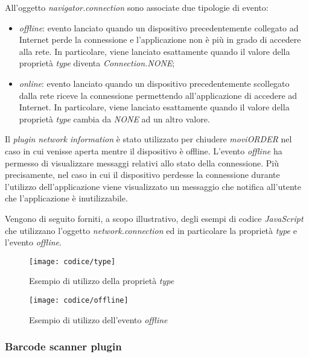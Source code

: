 All'oggetto \textit{navigator.connection} sono associate due tipologie di evento:
\begin{itemize}
	\item \textit{offline}: evento lanciato quando un dispositivo precedentemente collegato ad Internet perde la connessione e l'applicazione non è più in grado di accedere alla rete. In particolare, viene lanciato esattamente quando il valore della proprietà \textit{type} diventa \textit{Connection.NONE};
	\item \textit{online}: evento lanciato quando un dispositivo precedentemente scollegato dalla rete riceve la connessione permettendo all'applicazione di accedere ad Internet. In particolare, viene lanciato esattamente quando il valore della proprietà \textit{type} cambia da \textit{NONE} ad un altro valore.
\end{itemize}
Il \textit{plugin} \textit{network information} è stato utilizzato per chiudere \textit{moviORDER} nel caso in cui venisse aperta mentre il dispositivo è offline. L'evento \textit{offline} ha permesso di visualizzare messaggi relativi allo stato della connessione. Più precisamente, nel caso in cui il dispositivo perdesse la connessione durante l'utilizzo dell'applicazione viene visualizzato un messaggio che notifica all'utente che l'applicazione è inutilizzabile.

Vengono di seguito forniti, a scopo illustrativo, degli esempi di codice \textit{JavaScript} che utilizzano l'oggetto \textit{network.connection} ed in particolare la proprietà \textit{type} e l'evento \textit{offline}.

\begin{figure}[!h] 
    \centering 
    \texttt{[image: codice/type]} 
    \caption{Esempio di utilizzo della proprietà \textit{type}}
\end{figure}

\begin{figure}[!h] 
    \centering 
    \texttt{[image: codice/offline]} 
    \caption{Esempio di utilizzo dell'evento \textit{offline}}
\end{figure}

\subsubsection{Barcode scanner plugin}

